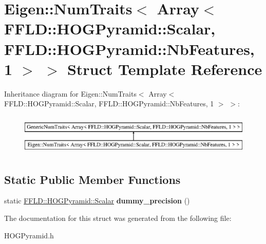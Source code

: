 \hypertarget{struct_eigen_1_1_num_traits_3_01_array_3_01_f_f_l_d_1_1_h_o_g_pyramid_1_1_scalar_00_01_f_f_l_d_179908bda57298c5a601e3a022e5c08f1}{\section{Eigen\-:\-:Num\-Traits$<$ Array$<$ F\-F\-L\-D\-:\-:H\-O\-G\-Pyramid\-:\-:Scalar, F\-F\-L\-D\-:\-:H\-O\-G\-Pyramid\-:\-:Nb\-Features, 1 $>$ $>$ Struct Template Reference}
\label{struct_eigen_1_1_num_traits_3_01_array_3_01_f_f_l_d_1_1_h_o_g_pyramid_1_1_scalar_00_01_f_f_l_d_179908bda57298c5a601e3a022e5c08f1}
}
Inheritance diagram for Eigen\-:\-:Num\-Traits$<$ Array$<$ F\-F\-L\-D\-:\-:H\-O\-G\-Pyramid\-:\-:Scalar, F\-F\-L\-D\-:\-:H\-O\-G\-Pyramid\-:\-:Nb\-Features, 1 $>$ $>$\-:\begin{figure}[H]
\begin{center}
\leavevmode
\includegraphics[height=1.978799cm]{struct_eigen_1_1_num_traits_3_01_array_3_01_f_f_l_d_1_1_h_o_g_pyramid_1_1_scalar_00_01_f_f_l_d_179908bda57298c5a601e3a022e5c08f1}
\end{center}
\end{figure}
\subsection*{Static Public Member Functions}
\begin{DoxyCompactItemize}
\item 
\hypertarget{struct_eigen_1_1_num_traits_3_01_array_3_01_f_f_l_d_1_1_h_o_g_pyramid_1_1_scalar_00_01_f_f_l_d_179908bda57298c5a601e3a022e5c08f1_af17f381194aecb89e1c136d2ee408d64}{static \hyperlink{class_f_f_l_d_1_1_h_o_g_pyramid_af17c08ed86557e0a0aecb4814daf87c3}{F\-F\-L\-D\-::\-H\-O\-G\-Pyramid\-::\-Scalar} {\bfseries dummy\-\_\-precision} ()}\label{struct_eigen_1_1_num_traits_3_01_array_3_01_f_f_l_d_1_1_h_o_g_pyramid_1_1_scalar_00_01_f_f_l_d_179908bda57298c5a601e3a022e5c08f1_af17f381194aecb89e1c136d2ee408d64}

\end{DoxyCompactItemize}


The documentation for this struct was generated from the following file\-:\begin{DoxyCompactItemize}
\item 
H\-O\-G\-Pyramid.\-h\end{DoxyCompactItemize}
